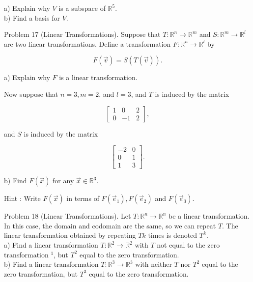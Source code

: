 \documentclass[10pt]{article}
\begin{document}
a) Explain why $V$ is a subspace of $\mathbb{R}^{5}$.\\
b) Find a basis for $V$.

Problem 17 (Linear Transformations). Suppose that $T: \mathbb{R}^{n} \rightarrow \mathbb{R}^{m}$ and $S: \mathbb{R}^{m} \rightarrow \mathbb{R}^{l}$ are two linear transformations. Define a transformation $F: \mathbb{R}^{n} \rightarrow \mathbb{R}^{l}$ by

$$
F(\vec{v})=S(T(\vec{v})) .
$$

a) Explain why $F$ is a linear transformation.

Now suppose that $n=3, m=2$, and $l=3$, and $T$ is induced by the matrix

$$
\left[\begin{array}{ccc}
1 & 0 & 2 \\
0 & -1 & 2
\end{array}\right],
$$

and $S$ is induced by the matrix

$$
\left[\begin{array}{cc}
-2 & 0 \\
0 & 1 \\
1 & 3
\end{array}\right] .
$$

b) Find $F(\vec{x})$ for any $\vec{x} \in \mathbb{R}^{3}$.

Hint : Write $F(\vec{x})$ in terms of $F\left(\vec{e}_{1}\right), F\left(\vec{e}_{2}\right)$ and $F\left(\vec{e}_{3}\right)$.

Problem 18 (Linear Transformations). Let $T: \mathbb{R}^{n} \rightarrow \mathbb{R}^{n}$ be a linear transformation. In this case, the domain and codomain are the same, so we can repeat $T$. The linear transformation obtained by repeating $T k$ times is denoted $T^{k}$.\\
a) Find a linear transformation $T: \mathbb{R}^{2} \rightarrow \mathbb{R}^{2}$ with $T$ not equal to the zero transformation ${ }^{1}$, but $T^{2}$ equal to the zero transformation.\\
b) Find a linear transformation $T: \mathbb{R}^{3} \rightarrow \mathbb{R}^{3}$ with neither $T$ nor $T^{2}$ equal to the zero transformation, but $T^{3}$ equal to the zero transformation.
\end{document}
